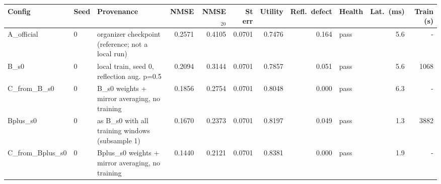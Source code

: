 \begin{tabular}{lllrrrrrlrr}
\toprule
Config & Seed & Provenance & NMSE & NMSE$_{20}$ & St err & Utility & Refl.\ defect & Health & Lat.\ (ms) & Train (s) \\
\midrule
A\_official & 0 & organizer checkpoint (reference; not a local run) & 0.2571 & 0.4105 & 0.0701 & 0.7476 & 0.164 & pass & 5.6 & - \\
B\_s0 & 0 & local train, seed 0, reflection aug. p=0.5 & 0.2094 & 0.3144 & 0.0701 & 0.7857 & 0.051 & pass & 5.6 & 1068 \\
C\_from\_B\_s0 & 0 & B\_s0 weights + mirror averaging, no training & 0.1856 & 0.2754 & 0.0701 & 0.8048 & 0.000 & pass & 6.3 & - \\
Bplus\_s0 & 0 & as B\_s0 with all training windows (subsample 1) & 0.1670 & 0.2373 & 0.0701 & 0.8197 & 0.049 & pass & 1.3 & 3882 \\
C\_from\_Bplus\_s0 & 0 & Bplus\_s0 weights + mirror averaging, no training & 0.1440 & 0.2121 & 0.0701 & 0.8381 & 0.000 & pass & 1.9 & - \\
\bottomrule
\end{tabular}
